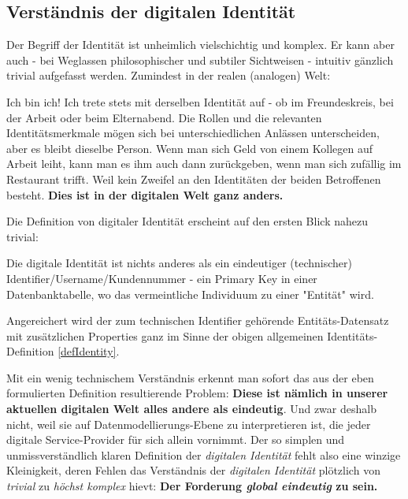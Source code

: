 \subsection{Verständnis der digitalen Identität}
\label{sec:einleitung_digitale_identitaet}

Der Begriff der Identität ist unheimlich vielschichtig und komplex. Er kann aber auch - bei Weglassen philosophischer und subtiler Sichtweisen - intuitiv gänzlich trivial aufgefasst werden. Zumindest in der realen (analogen) Welt:

Ich bin ich! Ich trete stets mit derselben Identität auf - ob im Freundeskreis, bei der Arbeit oder beim Elternabend. Die Rollen und die relevanten Identitätsmerkmale mögen sich bei unterschiedlichen Anlässen unterscheiden, aber es bleibt dieselbe Person. Wenn man sich Geld von einem Kollegen auf Arbeit leiht, kann man es ihm auch dann zurückgeben, wenn man sich zufällig im Restaurant trifft. Weil kein Zweifel an den Identitäten der beiden Betroffenen besteht. \textbf{Dies ist in der digitalen Welt ganz anders.}

\vspace{0.2cm}

Die Definition von digitaler Identität erscheint auf den ersten Blick nahezu trivial:

\vspace{0.3cm}

\begin{Business-Def}\label{defDigIdentity}

Die digitale Identität ist nichts anderes als ein eindeutiger (technischer) Identifier/Username/Kundennummer - ein Primary Key in einer Datenbanktabelle, wo das vermeintliche Individuum zu einer "Entität" wird.

\vspace{0.2cm}

Angereichert wird der zum technischen Identifier gehörende Entitäts-Datensatz mit zusätzlichen Properties ganz im Sinne der obigen allgemeinen Identitäts-Definition \ref{defIdentity}. 

\end{Business-Def}

\vspace{0.3cm}

Mit ein wenig technischem Verständnis erkennt man sofort das aus der eben formulierten Definition resultierende Problem: \textbf{Diese ist nämlich in unserer aktuellen digitalen Welt alles andere als eindeutig}. Und zwar deshalb nicht, weil sie auf Datenmodellierungs-Ebene zu interpretieren ist, die jeder digitale Service-Provider für sich allein vornimmt. Der so simplen und unmissverständlich klaren Definition der \textit{digitalen Identität} fehlt also eine winzige Kleinigkeit, deren Fehlen das Verständnis der \textit{digitalen Identität} plötzlich von \textit{trivial} zu \textit{höchst komplex} hievt: \textbf{Der Forderung \textit{global eindeutig} zu sein.}

